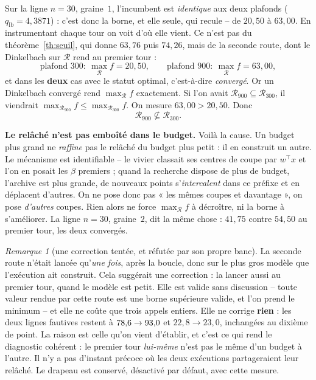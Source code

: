 \documentclass[11pt,a4paper]{article}
\theoremstyle{plain}
\theoremstyle{remark}
\newtheorem{remark}{Remarque}
\newcommand{\Rcal}{\mathcal{R}}
\begin{document}
Sur la ligne $n=30$, graine~$1$, l'incumbent est \emph{identique} aux deux
plafonds ($q_{\text{lb}}=4{,}3871$) : c'est donc la borne, et elle seule, qui
recule -- de $20{,}50$ à $63{,}00$. En instrumentant chaque tour on voit
d'où elle vient. Ce n'est pas du théorème~\ref{th:seuil}, qui donne $63{,}76$
puis $74{,}26$, mais de la seconde route, dont le Dinkelbach sur $\Rcal$
rend au premier tour :
\[
  \text{plafond } 300 : \ \max_{\Rcal}f = 20{,}50,
  \qquad
  \text{plafond } 900 : \ \max_{\Rcal}f = 63{,}00,
\]
et dans les \textbf{deux} cas avec le statut \textsf{optimal}, c'est-à-dire
\emph{convergé}. Or un Dinkelbach convergé rend $\max_{\Rcal}f$ exactement.
Si l'on avait $\Rcal_{900}\subseteq\Rcal_{300}$, il viendrait
$\max_{\Rcal_{900}}f\le\max_{\Rcal_{300}}f$. On mesure $63{,}00>20{,}50$.
Donc
\[
  \Rcal_{900}\not\subseteq\Rcal_{300}.
\]

\noindent
\textbf{Le relâché n'est pas emboîté dans le budget.} Voilà la cause. Un
budget plus grand ne \emph{raffine} pas le relâché du budget plus petit : il
en construit un autre. Le mécanisme est identifiable -- le vivier classait
ses centres de coupe par $w^\top x$ et l'on en posait les $\beta$ premiers ;
quand
la recherche dispose de plus de budget, l'archive est plus grande, de
nouveaux points s'\emph{intercalent} dans ce préfixe et en déplacent
d'autres. On ne pose donc pas « les mêmes coupes et davantage », on pose
\emph{d'autres} coupes. Rien alors ne force $\max_{\Rcal}f$ à décroître, ni
la borne à s'améliorer. La ligne $n=30$, graine~$2$, dit la même chose :
$41{,}75$ contre $54{,}50$ au premier tour, les deux convergés.

\begin{remark}[une correction tentée, et réfutée par son propre banc]
La seconde route n'était lancée qu'\emph{une fois}, après la boucle, donc
sur le plus gros modèle que l'exécution ait construit. Cela suggérait une
correction : la lancer aussi au premier tour, quand le modèle est petit.
Elle est valide sans discussion -- toute valeur rendue par cette route est
une borne supérieure valide, et l'on prend le minimum -- et elle ne coûte
que trois appels entiers. Elle ne corrige \textbf{rien} : les deux lignes
fautives restent à $78{,}6{}\to93{,}0$ et $22{,}8\to23{,}0$, inchangées au
dixième de point. La raison est celle qu'on vient d'établir, et c'est ce qui
rend le diagnostic cohérent : le premier tour \emph{lui-même} n'est pas le
même d'un budget à l'autre. Il n'y a pas d'instant précoce où les deux
exécutions partageraient leur relâché. Le drapeau est conservé, désactivé
par défaut, avec cette mesure.
\end{remark}
\end{document}
